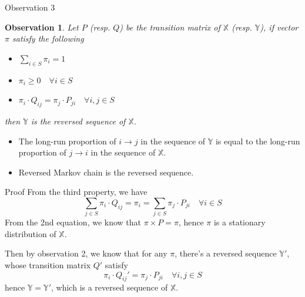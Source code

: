 \documentclass[mathserif]{beamer}
\newtheorem{obs}{Observation}
\begin{document}
\begin{frame}{Observation 3}\label{obs3}
\begin{obs}
Let $P$ (resp. $Q$) be the transition matrix of $\mathbb{X}$ (resp. $\mathbb{Y}$),
if vector $\pi$ satisfy the following
\begin{itemize}
\item $\sum_{i\in S} \pi_i = 1$
\item $\pi_i \geq 0 \quad\forall i \in S$
\item $\pi_i \cdot Q_{ij} = \pi_j \cdot P_{ji} \quad\forall i,j \in S$
\end{itemize}
then $\mathbb{Y}$ is the reversed sequence of $\mathbb{X}$.
\end{obs}
\begin{itemize}
\item The long-run proportion of $i\to j$ in the sequence of $\mathbb{Y}$ is equal to the long-run proportion of $j\to i$ in the sequence of $\mathbb{X}$.
\item Reversed Markov chain is the reversed sequence.
\end{itemize}
\end{frame}

\begin{frame}{Proof}
From the third property, we have
\[
\sum_{j\in S} \pi_i \cdot Q_{ij} = \pi_i = \sum_{j\in S} \pi_j \cdot P_{ji} \quad\forall i \in S
\]
From the 2nd equation, we know that $\pi \times P = \pi$, hence $\pi$ is a stationary distribution of $\mathbb{X}$.

Then by observation 2, we know that for any $\pi$, there's a reversed sequence $\mathbb{Y}'$, whose transition matrix $Q'$ satisfy
\[
\pi_i \cdot Q_{ij}' = \pi_j \cdot P_{ji} \quad\forall i,j \in S
\]
hence $\mathbb{Y} = \mathbb{Y}'$, which is a reversed sequence of $\mathbb{X}$.
\end{frame}
\end{document}
